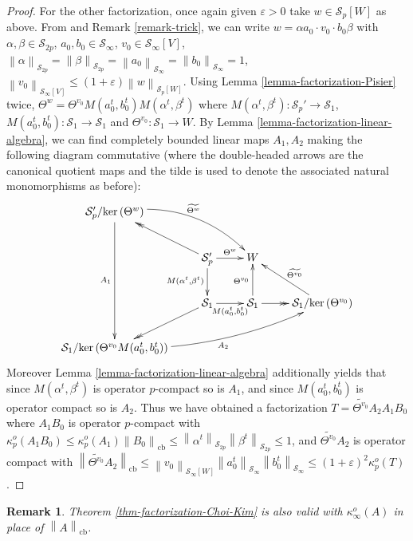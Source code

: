\documentclass[11pt]{amsart}
\DeclareMathOperator{\cb}{cb}
\newcommand{\n}[1]{ \left\|#1\right\| }
\newtheorem{remark}[theorem]{Remark}
\numberwithin{equation}{section}
\def\ker{{\rm ker\, }}
\begin{document}
\begin{proof}
For the other factorization, once again given $\varepsilon>0$ take $w \in \mathcal{S}_p[W]$ as above. From \cite[Thm. 1.5]{Pisier-Asterisque} and Remark \ref{remark-trick}, we can write $w = \alpha a_0\cdot v_0 \cdot b_0\beta$ with $\alpha,\beta \in \mathcal{S}_{2p}$, $a_0,b_0 \in \mathcal{S}_\infty$, $v_0\in \mathcal{S}_\infty[V]$,  $\n{\alpha}_{\mathcal{S}_{2p}} = \n{\beta}_{\mathcal{S}_{2p}} = \n{a_0}_{\mathcal{S}_\infty} = \n{b_0}_{\mathcal{S}_\infty} = 1$, $\n{v_0}_{\mathcal{S}_\infty[V]} \le (1+\varepsilon) \n{w}_{\mathcal{S}_p[W]}$. Using Lemma \ref{lemma-factorization-Pisier} twice, $\Theta^w = \Theta^{v_0}M(a_0^t,b_0^t)M(\alpha^t,\beta^t)$ where $M(\alpha^t,\beta^t): \mathcal{S}_p' \to \mathcal{S}_1$, $M(a_0^t,b_0^t): \mathcal{S}_1 \to \mathcal{S}_1$ and $\Theta^{v_0} : \mathcal{S}_1 \to W$.
By Lemma \ref{lemma-factorization-linear-algebra}, we can find completely bounded linear maps 
$A_1, A_2$ making the following diagram commutative (where the double-headed arrows are the canonical quotient maps and the tilde is used to denote the associated natural monomorphisms as before):
\[
\xymatrix{
 \mathcal S'_p /\ker(\Theta^w)\ar@/^1.5pc/[drr]^{\widetilde{\Theta^{w}}} \ar[ddd]_{A_1} & & &\\
&\mathcal{S}_p' \ar@{->>}[ul] \ar[r]^{\Theta^w} \ar[d]_{M(\alpha^t,\beta^t)} &W & \\
& \mathcal{S}_1 \ar@{->>}[dl] \ar[r]_{ M(a_0^t,b_0^t) } & \mathcal{S}_1 \ar[u]^{\Theta^{v_0}}\ar@{->>}[r] & \mathcal{S}_1/\ker(\Theta^{v_0}) \ar[lu]_{\widetilde{\Theta^{v_0}}} \\
\mathcal{S}_1/\ker(\Theta^{v_0}M(a_0^t,b_0^t)) \ar@/_1pc/[urrr]_{A_2}  & & &\\
}
\]
Moreover Lemma \ref{lemma-factorization-linear-algebra} additionally yields that since $M(\alpha^t,\beta^t)$ is operator $p$-compact so is $A_1$, and since $M(a_0^t,b_0^t)$ is operator compact so is $A_2$.
Thus we have obtained a factorization $T = \widetilde{\Theta^{v_0}}A_2A_1B_0$  where $A_1B_0$ is operator $p$-compact with
$\kappa_p^o(A_1B_0) \le \kappa^o_p(A_1) \n{B_0}_{\cb} \le \n{\alpha^t}_{\mathcal{S}_{2p}} \n{\beta^t}_{\mathcal{S}_{2p}} \le 1$, and $\widetilde{\Theta^{v_0}}A_2$ is operator compact with $\n{\widetilde{\Theta^{v_0}}A_2}_{\cb} \le \n{v_0}_{\mathcal{S}_\infty[W]}\n{a_0^t}_{\mathcal{S}_\infty}\n{b_0^t}_{\mathcal{S}_\infty} \le (1+\varepsilon)^2\kappa^o_p(T)$. 
\end{proof}



\begin{remark}
Theorem \ref{thm-factorization-Choi-Kim} is also valid with $\kappa_\infty^o(A)$ in place of $\n{A}_{\cb}$.
\end{remark}
\end{document}

